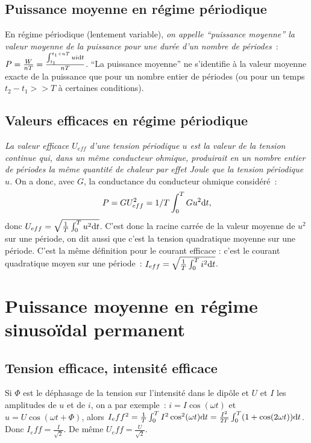 \subsection{Puissance moyenne en régime périodique}%
En régime périodique (lentement variable), \emph{on appelle ``puissance 
moyenne'' la valeur moyenne de la puissance pour une durée d'un nombre de 
périodes}~: \(P = \frac{W}{nT} = \frac{\int_{t_1}^{t_1+nT} ui \mathrm{d} t}{nT}\). ``La 
puissance moyenne'' ne s'identifie à la valeur moyenne exacte de la puissance 
que pour un nombre entier de périodes (ou pour un temps \(t_2-t_1 >> T\) à 
certaines conditions).
\subsection{Valeurs efficaces en régime périodique}%
\emph{La valeur efficace \(U_{eff}\) d'une tension périodique \(u\) est la 
valeur de la tension continue qui, dans un même conducteur ohmique, produirait 
en un nombre entier de périodes la même quantité de chaleur par effet Joule que 
la tension périodique \(u\).} On a donc, avec \(G\), la conductance du 
conducteur ohmique considéré~:%
\begin{equation}%
  P = G U_{eff}^2 = 1/T \int_0^T G u^2 \D t,
\end{equation}%
donc \(U_{eff} = \sqrt{\frac{1}{T} \int_0^T u^2 \mathrm{d} t}\). C'est donc la racine 
carrée de la valeur moyenne de \(u^2\) sur une période, on dit aussi que c'est 
la tension quadratique moyenne sur une période. C'est la même définition pour 
le courant efficace : c'est le courant quadratique moyen sur une période~: 
\(I_{eff} = \sqrt{\frac{1}{T} \int_0^T i^2 \mathrm{d} t}\).

\section{Puissance moyenne en régime sinusoïdal permanent}%
\subsection{Tension efficace, intensité efficace}%
Si \(\Phi\) est le déphasage de la tension sur l'intensité dans le dipôle et 
\(U\) et \(I\) les amplitudes de \(u\) et de \(i\), on a par exemple~: 
\(i=I\cos(\omega t)\) et \(u=U\cos(\omega t+\Phi)\), alors \(I_eff^2 = 
\frac{1}{T} \int_0^T I^2 \cos^2(\omega t) \mathrm{d} t = \frac{I^2}{2T} \int_0^T 
(1+\cos(2\omega t)) \mathrm{d} t\). Donc \(I_eff = \frac{I}{\sqrt{2}}\). De même 
\(U_eff = \frac{U}{\sqrt{2}}\).
